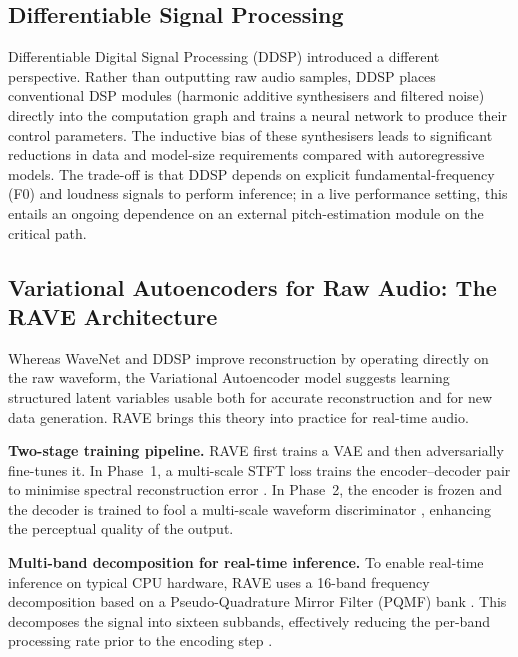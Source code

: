 \documentclass[a4paper,11pt,oneside,openany]{book}
\begin{document}
\subsection*{Differentiable Signal Processing}

Differentiable Digital Signal Processing (DDSP) \parencite{engel2020ddsp} introduced a different perspective. Rather than outputting raw audio samples, DDSP places conventional DSP modules (harmonic additive synthesisers and filtered noise) directly into the computation graph and trains a neural network to produce their control parameters. The inductive bias of these synthesisers leads to significant reductions in data and model-size requirements compared with autoregressive models. The trade-off is that DDSP depends on explicit fundamental-frequency (F0) and loudness signals to perform inference; in a live performance setting, this entails an ongoing dependence on an external pitch-estimation module on the critical path.

\subsection*{Variational Autoencoders for Raw Audio: The RAVE Architecture}

Whereas WaveNet and DDSP improve reconstruction by operating directly on the raw waveform, the Variational Autoencoder model \parencite{kingma2013vae} suggests learning structured latent variables usable both for accurate reconstruction and for new data generation. RAVE \parencite{caillon2021rave} brings this theory into practice for real-time audio.

\textbf{Two-stage training pipeline.} RAVE first trains a VAE and then adversarially fine-tunes it. In Phase~1, a multi-scale STFT loss trains the encoder--decoder pair to minimise spectral reconstruction error \parencite{engel2020ddsp,caillon2021rave}. In Phase~2, the encoder is frozen and the decoder is trained to fool a multi-scale waveform discriminator \parencite{goodfellow2014gan,kong2020hifigan}, enhancing the perceptual quality of the output.

\textbf{Multi-band decomposition for real-time inference.} To enable real-time inference on typical CPU hardware, RAVE uses a 16-band frequency decomposition based on a Pseudo-Quadrature Mirror Filter (PQMF) bank \parencite{cruzroldan2002pqmf}. This decomposes the signal into sixteen subbands, effectively reducing the per-band processing rate prior to the encoding step \parencite{caillon2021rave}.
\end{document}
